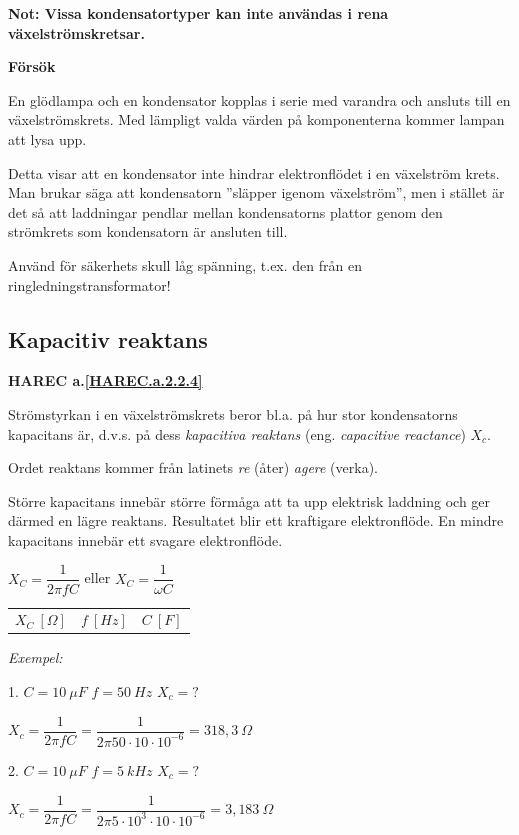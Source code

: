 \textbf{Not: Vissa kondensatortyper kan inte användas i rena
  växelströmskretsar.}

\textbf{Försök}

En glödlampa och en kondensator kopplas i serie med varandra och ansluts till en
växelströmskrets. Med lämpligt valda värden på komponenterna kommer lampan att
lysa upp.

Detta visar att en kondensator inte hindrar elektronflödet i en växelström
krets. Man brukar säga att kondensatorn ''släpper igenom växelström'', men i
stället är det så att laddningar pendlar mellan kondensatorns plattor genom den
strömkrets som kondensatorn är ansluten till.

Använd för säkerhets skull låg spänning, t.ex. den från en
ringledningstransformator!

\subsection{Kapacitiv reaktans}
\textbf{HAREC a.\ref{HAREC.a.2.2.4}\label{myHAREC.a.2.2.4}}

Strömstyrkan i en växelströmskrets beror bl.a. på hur stor kondensatorns
kapacitans är, d.v.s. på dess \emph{kapacitiva reaktans} (eng.
\emph{capacitive reactance}) \(X_c\).

Ordet reaktans kommer från latinets \emph{re} (åter) \emph{agere} (verka).

Större kapacitans innebär större förmåga att ta upp elektrisk laddning och ger
därmed en lägre reaktans. Resultatet blir ett kraftigare elektronflöde.
En mindre kapacitans innebär ett svagare elektronflöde.

\(X_C = \dfrac{1}{2\pi fC}\) eller \(X_C = \dfrac{1}{\omega C}\)

\begin{tabular}{lll}
\(X_C\ [\Omega]\) & \(f\ [Hz]\) & \(C\ [F]\) 
\end{tabular}

\emph{Exempel:}

1. \(C = 10\ \mu F\) \(f = 50\ Hz\) \(X_c = ?\)

\(X_c = \dfrac{1}{2\pi fC} = \dfrac{1}{2\pi 50 \cdot 10 \cdot 10^{-6}} = 318,3\ \Omega\)

2. \(C = 10\ \mu F\) \(f = 5\ kHz\) \(X_c = ?\)

\(X_c = \dfrac{1}{2\pi fC} = \dfrac{1}{2\pi 5 \cdot 10^3 \cdot 10 \cdot 10^{-6}}
= 3,183\ \Omega\)

